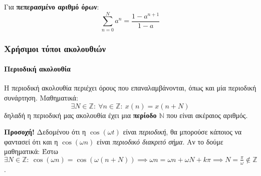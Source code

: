 \documentclass[11pt,a4paper,notitlepage,fleqn]{article}
\begin{document}
Για \textbf{πεπερασμένο αριθμό όρων}:
\[
\sum_{n=0}^{N} a^n
= \frac{1-a^{n+1}}{1-a}
\]

\subsubsection{Χρήσιμοι τύποι ακολουθιών}
\paragraph{Περιοδική ακολουθία}
Η περιοδική ακολουθία περιέχει όρους που επαναλαμβάνονται, όπως και μία περιοδική συνάρτηση.
Μαθηματικά:
\[
\exists N \in \mathbb Z: \ \forall n \in \mathbb Z: \ x(n) = x(n+N)
\]
δηλαδή η περιοδική μας ακολουθία έχει μια \textbf{περίοδο \( \mathbb N \)} που είναι ακέραιος αριθμός.

\textbf{Προσοχή!} Δεδομένου ότι η \( \cos(\omega t) \) είναι \textit{περιοδική}, θα μπορούσε κάποιος
να φαντασεί ότι και η \( \cos(\omega n) \) είναι \textit{περιοδικό διακριτό σήμα}. Αν το δούμε μαθηματικά:
Έστω \( \exists N \in \mathbb Z:\ \cos(\omega n)=\cos\left( \omega (n+N) \right)
\implies \omega n = \omega n + \omega N + kπ \implies N = \frac{π}{\omega } \notin \mathbb Z \).
\end{document}
